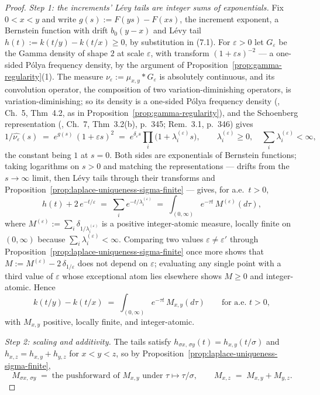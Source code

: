 \begin{proof}
\emph{Step 1: the increments' L\'evy tails are integer sums of exponentials.} Fix
$0 < x < y$ and write $g(s) := F(ys) - F(xs)$, the increment exponent, a Bernstein
function with drift $b_0(y - x)$ and L\'evy tail
$h(t) := k(t/y) - k(t/x) \ge 0$, by substitution in (7.1). For $\varepsilon > 0$ let
$G_\varepsilon$ be the Gamma density of shape $2$ at scale $\varepsilon$, with transform
$(1 + \varepsilon s)^{-2}$ --- a one-sided P\'olya frequency density, by the argument of
Proposition~\ref{prop:gamma-regularity}(1). The measure
$\nu_\varepsilon := \mu_{x,y} * G_\varepsilon$ is absolutely continuous, and its
convolution operator, the composition of two variation-diminishing operators, is
variation-diminishing; so its density is a one-sided P\'olya frequency density
(, Ch.~5, Thm~4.2, as in
Proposition~\ref{prop:gamma-regularity}), and the Schoenberg representation
(, Ch.~7, Thm~3.2(b), p.~345; Rem.~3.1, p.~346) gives
\[
  1/\widehat{\nu_\varepsilon}(s) \;=\; e^{g(s)}\,(1 + \varepsilon s)^{2}
  \;=\; e^{\delta_\varepsilon s} \prod_i \bigl(1 + \lambda^{(\varepsilon)}_i s\bigr),
  \qquad \lambda^{(\varepsilon)}_i \ge 0, \quad
  \textstyle\sum_i \lambda^{(\varepsilon)}_i < \infty,
\]
the constant being $1$ at $s = 0$. Both sides are exponentials of Bernstein functions;
taking logarithms on $s > 0$ and matching the representations --- drifts from the
$s \to \infty$ limit, then L\'evy tails through their transforms and
Proposition~\ref{prop:laplace-uniqueness-sigma-finite} --- gives, for a.e.\ $t > 0$,
\[
  h(t) + 2\,e^{-t/\varepsilon} \;=\; \sum_i e^{-t/\lambda^{(\varepsilon)}_i}
  \;=\; \int_{(0,\infty)} e^{-\tau t}\, M^{(\varepsilon)}(d\tau),
\]
where $M^{(\varepsilon)} := \sum_i \delta_{1/\lambda^{(\varepsilon)}_i}$ is a positive
integer-atomic measure, locally finite on $(0,\infty)$ because
$\sum_i \lambda^{(\varepsilon)}_i < \infty$. Comparing two values
$\varepsilon \ne \varepsilon'$ through
Proposition~\ref{prop:laplace-uniqueness-sigma-finite} once more shows that
$M := M^{(\varepsilon)} - 2\,\delta_{1/\varepsilon}$ does not depend on $\varepsilon$;
evaluating any single point with a third value of $\varepsilon$ whose exceptional atom
lies elsewhere shows $M \ge 0$ and integer-atomic. Hence
\[
  k(t/y) - k(t/x) \;=\; \int_{(0,\infty)} e^{-\tau t}\, M_{x,y}(d\tau)
  \qquad \text{for a.e.\ } t > 0,
\]
with $M_{x,y}$ positive, locally finite, and integer-atomic.

\emph{Step 2: scaling and additivity.} The tails satisfy
$h_{\sigma x,\, \sigma y}(t) = h_{x,y}(t/\sigma)$ and $h_{x,z} = h_{x,y} + h_{y,z}$ for
$x < y < z$, so by Proposition~\ref{prop:laplace-uniqueness-sigma-finite},
\[
  M_{\sigma x,\, \sigma y} \;=\; \text{the pushforward of } M_{x,y}
  \text{ under } \tau \mapsto \tau/\sigma,
  \qquad
  M_{x,z} \;=\; M_{x,y} + M_{y,z}.
\]


\end{proof}
